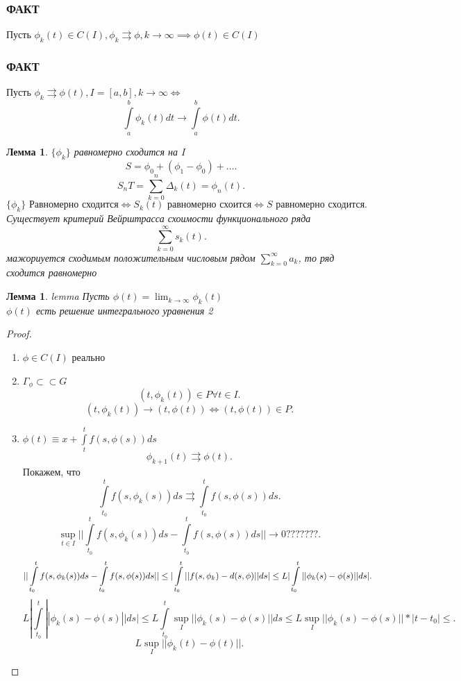 \documentclass[14pt]{extarticle}
\newtheorem{lemma}[theorem]{Лемма}
\begin{document}
 \subsubsection{ФАКТ}
 Пусть $\phi_{k}(t) \in C(I), \phi_{k} \rightrightarrows \phi , k \to \infty \implies \phi(t) \in C(I)$
 \subsubsection{ФАКТ}
 Пусть $\phi_{k} \rightrightarrows \phi(t) , I =[a,b], k \to \infty \iff$
 \[
 \int\limits_{a}^{b} \phi_{k}(t)  dt \to \int\limits_{a}^{b} \phi(t) dt 
 .\] 
 \begin{lemma}
     $\{\phi_{k}\}$ равномерно сходится на $I$
      \[
     S = \phi_0 + (\phi_1 - \phi_0) + \dots
     .\] 
     \[
     S_{n}T = \sum_{k=0}^{n} \varDelta_{k} (t) = \phi_{n}(t)
     .\] 
     \[
         \{\phi_{k}\} \text{~Равномерно сходится} \iff S_{k}(t) \text{~равномерно схоится}\iff S \text{~равномерно сходится}
     .\] 
     Существует критерий Вейрштрасса схоимости функционального ряда
     \[
     \sum_{k=0}^{\infty} s_{k}(t)
     .\] 
     мажориуется сходимым положительным числовым рядом $\sum_{k = 0}^{\infty} a_{k}$, то ряд сходится равномерно
 \end{lemma}
 \begin{lemma}{lemma}
     Пусть $\phi(t) = \lim_{k \to \infty} \phi_{k}(t)$ \\
     $\phi(t)$ есть решение интегрального уравнения 2
 \end{lemma}
 \begin{proof}
     \begin{enumerate}
         \item $\phi \in C(I)$ реально
        \item  $\Gamma_{\phi} \subset  \subset G$
             \[
                 (t,\phi_{k}(t) ) \in P \forall  t \in I 
             .\] 
             \[
                 (t, \phi_{k}(t)) \to (t,\phi(t)) \iff (t,\phi(t)) \in P
             .\] 
        \item $\phi(t) \equiv x + \int\limits_{t}^{t} f(s,\phi(s)) ds  $
            \[
            \phi_{k + 1}(t) \rightrightarrows \phi(t)
            .\] 
            Покажем, что 
            \[
            \int\limits_{t_0}^{t} f(s,\phi_{k}(s))  ds \rightrightarrows \int\limits_{t_0}^{t} f(s,\phi(s))  ds
            .\] 
            \[
                \sup_{t\in I} || \int\limits_{t_0}^{t} f(s,\phi_{k}(s))  ds - \int\limits_{t_0}^{t} f(s,\phi(s))  ds || \to 0 ???????
            .\] 
            \[
            || \int\limits_{t_0}^{t} f(s,\phi_{k}(s))  ds - \int\limits_{t_0}^{t} f(s,\phi(s))  ds || \le  | \int\limits_{t_0}^{t} ||f(s,\phi_{k}) - d(s,\phi) || ds | \le \\
            L | \int\limits_{t_0}^{t} ||\phi_{k}(s) -\phi(s) ||ds |
            .\] 
            \[
            L | \int\limits_{t_0}^{t} ||\phi_{k}(s) -\phi(s) ||ds | \le  L \int\limits_{t_0}^{t} \sup_{I} || \phi_{k}(s) - \phi(s) || ds \le L \sup_{I} ||\phi_{k}(s) -\phi(s)|| * |t -t_0| \le 
            .\] 
            \[
            L \sup_{I} ||\phi_{k}(t) - \phi(t)||
            .\] 
     \end{enumerate}
 \end{proof}
\end{document}
